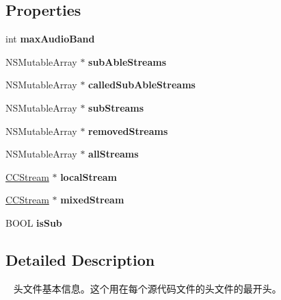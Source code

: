 \subsection*{Properties}
\begin{DoxyCompactItemize}
\item 
\mbox{\label{interface_c_c_speaker_a68845684dfddba71ca16b78096e3951e}} 
int {\bfseries max\+Audio\+Band}
\item 
\mbox{\label{interface_c_c_speaker_a7b81b3a1a6b687a76fcd618c1d6730c4}} 
N\+S\+Mutable\+Array $\ast$ {\bfseries sub\+Able\+Streams}
\item 
\mbox{\label{interface_c_c_speaker_a2d94f5c347a9b723d1cb64d0d3f29f14}} 
N\+S\+Mutable\+Array $\ast$ {\bfseries called\+Sub\+Able\+Streams}
\item 
\mbox{\label{interface_c_c_speaker_aa7d3906ed674087171cb652744949327}} 
N\+S\+Mutable\+Array $\ast$ {\bfseries sub\+Streams}
\item 
\mbox{\label{interface_c_c_speaker_acf197e807a3b6bd56a71e876436250b0}} 
N\+S\+Mutable\+Array $\ast$ {\bfseries removed\+Streams}
\item 
\mbox{\label{interface_c_c_speaker_ad5b303f7f285fcaad4cfb5c616dee5bf}} 
N\+S\+Mutable\+Array $\ast$ {\bfseries all\+Streams}
\item 
\mbox{\label{interface_c_c_speaker_a2f27f46c4ecd79920f16178222a0cdb6}} 
\hyperlink{interface_c_c_stream}{C\+C\+Stream} $\ast$ {\bfseries local\+Stream}
\item 
\mbox{\label{interface_c_c_speaker_a7e3ee4dbbc91275f40eb9981d679559b}} 
\hyperlink{interface_c_c_stream}{C\+C\+Stream} $\ast$ {\bfseries mixed\+Stream}
\item 
\mbox{\label{interface_c_c_speaker_a94b1f2c95600b9a518644514092f3f55}} 
B\+O\+OL {\bfseries is\+Sub}
\end{DoxyCompactItemize}


\subsection{Detailed Description}
  头文件基本信息。这个用在每个源代码文件的头文件的最开头。

